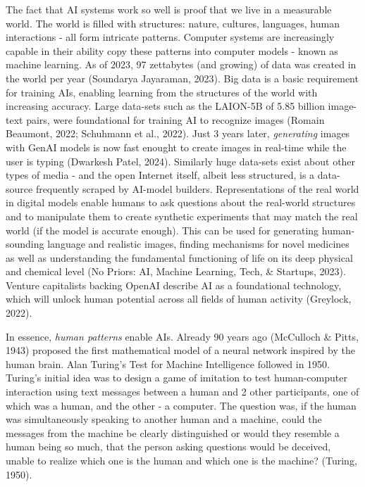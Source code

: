 \documentclass[
  letterpaper,
  DIV=11,
  numbers=noendperiod]{scrartcl}
\begin{document}
The fact that AI systems work so well is proof that we live in a
measurable world. The world is filled with structures: nature, cultures,
languages, human interactions - all form intricate patterns. Computer
systems are increasingly capable in their ability copy these patterns
into computer models - known as machine learning. As of 2023, 97
zettabytes (and growing) of data was created in the world per year
(Soundarya Jayaraman, 2023). Big data is a basic requirement for
training AIs, enabling learning from the structures of the world with
increasing accuracy. Large data-sets such as the LAION-5B of 5.85
billion image-text pairs, were foundational for training AI to recognize
images (Romain Beaumont, 2022; Schuhmann et al., 2022). Just 3 years
later, \emph{generating} images with GenAI models is now fast enought to
create images in real-time while the user is typing (Dwarkesh Patel,
2024). Similarly huge data-sets exist about other types of media - and
the open Internet itself, albeit less structured, is a data-source
frequently scraped by AI-model builders. Representations of the real
world in digital models enable humans to ask questions about the
real-world structures and to manipulate them to create synthetic
experiments that may match the real world (if the model is accurate
enough). This can be used for generating human-sounding language and
realistic images, finding mechanisms for novel medicines as well as
understanding the fundamental functioning of life on its deep physical
and chemical level (No Priors: AI, Machine Learning, Tech, \& Startups,
2023). Venture capitalists backing OpenAI describe AI as a foundational
technology, which will unlock human potential across all fields of human
activity (Greylock, 2022).

In essence, \emph{human patterns} enable AIs. Already 90 years ago
(McCulloch \& Pitts, 1943) proposed the first mathematical model of a
neural network inspired by the human brain. Alan Turing's Test for
Machine Intelligence followed in 1950. Turing's initial idea was to
design a game of imitation to test human-computer interaction using text
messages between a human and 2 other participants, one of which was a
human, and the other - a computer. The question was, if the human was
simultaneously speaking to another human and a machine, could the
messages from the machine be clearly distinguished or would they
resemble a human being so much, that the person asking questions would
be deceived, unable to realize which one is the human and which one is
the machine? (Turing, 1950).
\end{document}
